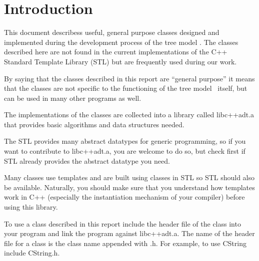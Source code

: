 \section*{Introduction}

This document describess useful, general purpose  classes 
designed and implemented during the development  
process of the tree model \lignum. The classes described here are not found in 
the current implementations of the C++ Standard Template Library (STL) 
but are frequently used during our work. 

By saying that the classes described in this report are
``general purpose'' it means that the classes are not
specific to the functioning of the tree model \lignum\
itself, but can be used in many other programs as well.

The implementations of the classes are collected into a 
library called \linebreak libc++adt.a that provides basic algorithms 
and data structures needed.

The STL provides many abstract datatypes for generic programming, so
if you want to contribute to libc++adt.a, you are welcome
to do so, but check first if STL already provides the abstract
datatype you need. 

Many classes use templates and are built using classes in STL
so STL should also be available. Naturally, you should make sure 
that you understand how templates work in C++ (especially the instantiation
mechanism of your compiler) before using this library. 

To use a class described in this report
include the header file of the class into your program
and link the program against libc++adt.a. The name of the 
header file for a class is the class name appended with .h. 
For example, to use CString include CString.h.
